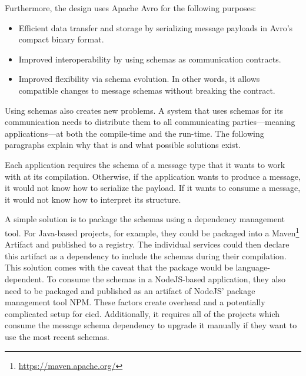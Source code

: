 Furthermore, the design uses Apache Avro for the following purposes:

\begin{itemize}
  \item Efficient data transfer and storage by serializing message payloads in Avro's compact binary format.
  \item Improved interoperability by using schemas as communication contracts.
  \item Improved flexibility via schema evolution. In other words, it allows compatible changes to message schemas without breaking the contract.
\end{itemize}

Using schemas also creates new problems.
A system that uses schemas for its communication needs to distribute them to all communicating parties---meaning applications---at both the compile-time and the run-time.
The following paragraphs explain why that is and what possible solutions exist.


Each application requires the schema of a message type that it wants to work with at its compilation.
Otherwise, if the application wants to produce a message, it would not know how to serialize the payload.
If it wants to consume a message, it would not know how to interpret its structure.

A simple solution is to package the schemas using a dependency management tool.
For Java-based projects, for example, they could be packaged into a Maven\footnote{\url{https://maven.apache.org/}} Artifact and published to a registry.
The individual services could then declare this artifact as a dependency to include the schemas during their compilation.
This solution comes with the caveat that the package would be language-dependent.
To consume the schemas in a NodeJS-based application, they also need to be packaged and published as an artifact of NodeJS' package management tool NPM.
These factors create overhead and a potentially complicated setup for \gls{cicd}.
Additionally, it requires all of the projects which consume the message schema dependency to upgrade it manually if they want to use the most recent schemas.

